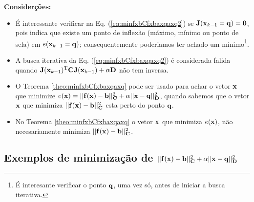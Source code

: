 \begin{theorem}
\textbf{Considerções:}

\begin{itemize}
\item É interessante verificar na Eq. (\ref{eq:minfxbCfxbaxqaxq2}) 
se  $\MATRIX{J}(\VECTOR{x}_{k-1}=\VECTOR{q}) = \MATRIX{0}$,
pois indica que existe um ponto de inflexão 
(máximo, mínimo ou ponto de sela) em $e(\VECTOR{x}_{k-1}=\VECTOR{q})$;
consequentemente poderiamos ter achado um mínimo\footnote{\label{foot:labq}É 
interesante verificar o ponto $\VECTOR{q}$, uma vez só, 
antes de iniciar a busca iterativa.}.
\item A busca iterativa da Eq. (\ref{eq:minfxbCfxbaxqaxq2}) é considerada falida quando 
$\MATRIX{J}(\VECTOR{x}_{k-1})^{\transpose}\MATRIX{C} \MATRIX{J}(\VECTOR{x}_{k-1}) +\alpha\MATRIX{D}$
não tem inversa.
\end{itemize}

\end{theorem} 

\begin{tcbattention}
\begin{itemize}
\item O Teorema \ref{theo:minfxbCfxbaxqaxq} pode ser usado para achar o vetor $\VECTOR{x}$
que minimize $e(\VECTOR{x})=||\VECTOR{f}(\VECTOR{x})-\VECTOR{b}||_{\MATRIX{C}}^2+\alpha||\VECTOR{x}-\VECTOR{q}||_{\MATRIX{D}}^2$,
quando sabemos que o vetor $\VECTOR{x}$ que minimiza $||\VECTOR{f}(\VECTOR{x})-\VECTOR{b}||_{\MATRIX{C}}^2$ 
esta perto do ponto $\VECTOR{q}$.
\item No Teorema \ref{theo:minfxbCfxbaxqaxq} o vetor $\VECTOR{x}$ que minimiza $e(\VECTOR{x})$, 
não necesariamente minimiza  $||\VECTOR{f}(\VECTOR{x})-\VECTOR{b}||_{\MATRIX{C}}^2$.
\end{itemize}
\end{tcbattention}

\subsection{Exemplos de minimização de 
$||\VECTOR{f}(\VECTOR{x})-\VECTOR{b}||_{\MATRIX{C}}^2+\alpha||\VECTOR{x}-\VECTOR{q}||_{\MATRIX{D}}^2$}


